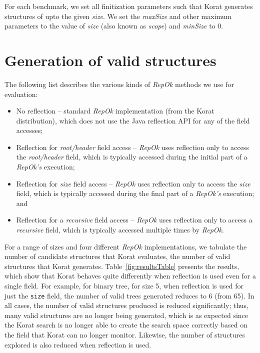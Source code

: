 For each benchmark, we set all finitization parameters such that Korat
generates structures of upto the given \emph{size}. We set the
\emph{maxSize} and other maximum parameters to the value of
\emph{size} (also known as \emph{scope}) and \emph{minSize} to 0.

\section{Generation of valid structures}
\label{sec:generation-of-valid-structures}
\noindent The following list describes the various kinds of \emph{RepOk}
methods we use for evaluation:
\begin{itemize}
\item No reflection -- standard \emph{RepOk} implementation (from the
  Korat distribution), which does not use the Java reflection API for
  any of the field accesses;
\item Reflection for \emph{root/header} field access -- \emph{RepOk}
  uses reflection only to access the \emph{root/header} field, which
  is typically accessed during the initial part of a \emph{RepOk's}
  execution;
\item Reflection for \emph{size} field access -- \emph{RepOk} uses
  reflection only to access the \emph{size} field, which is typically
  accessed during the final part of a \emph{RepOk's} execution; and
\item Reflection for a \emph{recursive} field access -- \emph{RepOk}
  uses reflection only to access a \emph{recursive} field, which is
  typically accessed multiple times by \emph{RepOk}.
\end{itemize}

For a range of sizes and four different \emph{RepOk} implementations,
we tabulate the number of candidate structures that Korat evaluates,
the number of valid structures that Korat generates.
Table~\ref{fig:resultsTable} presents the results, which show that
Korat behaves quite differently when reflection is used even for a
single field.  For example, for binary tree, for size 5, when
reflection is used for just the \texttt{size} field, the number of
valid trees generated reduces to 6 (from 65).  In all cases, the
number of valid structures produced is reduced significantly; thus,
many valid structures are no longer being generated, which is as
expected since the Korat search is no longer able to create the search
space correctly based on the field that Korat can no longer monitor.
Likewise, the number of structures explored is also reduced when
reflection is used.

